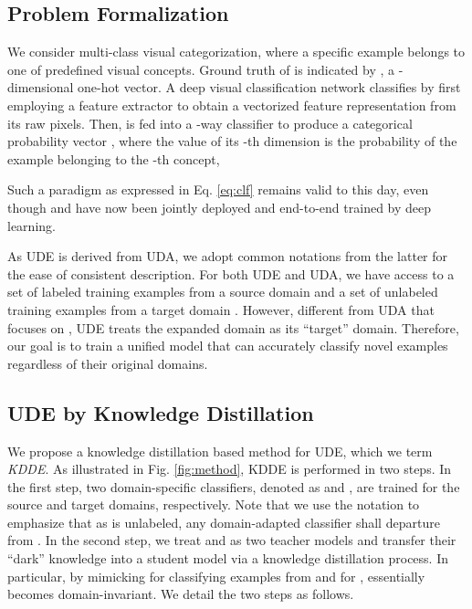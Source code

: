 
        
\subsection{Problem Formalization}


We consider multi-class visual categorization, where a specific example  belongs to one of  predefined visual concepts. Ground truth of  is indicated by , a -dimensional one-hot vector. A deep visual classification network  classifies  by first employing a feature extractor  to obtain a vectorized feature representation  from its raw pixels. Then,  is fed into a -way classifier  to produce a categorical probability vector , where the value of its -th dimension is the probability of the example belonging to the -th concept, \ie

Such a paradigm as expressed in Eq. \ref{eq:clf} remains valid to this day, even though  and  have now been jointly deployed and end-to-end trained by deep learning.



As UDE is derived from UDA, we adopt common notations from the latter for the ease of consistent description. 
For both UDE and UDA, we have access to a set of  labeled training examples  from a source domain  and a set of  unlabeled training examples  from a target domain . However, different from UDA that focuses on , UDE treats the expanded domain  as its ``target'' domain. Therefore, our goal is to train a unified model that can accurately classify novel examples regardless of their original domains.









\subsection{UDE by Knowledge Distillation} \label{ssec:kdde_model}

We propose a knowledge distillation based method for UDE, which we term \textit{KDDE}. As illustrated in Fig. \ref{fig:method}, KDDE is performed in two steps. In the first step, two domain-specific classifiers, denoted as  and , are trained for the source and target domains, respectively. Note that we use the notation  to emphasize that as  is unlabeled, any domain-adapted classifier shall departure from . In the second step, we treat  and  as two teacher models and transfer their ``dark'' knowledge into a student model  via a knowledge distillation process. In particular, by mimicking  for classifying examples from  and  for ,  essentially becomes domain-invariant.  We detail the two steps as follows.


